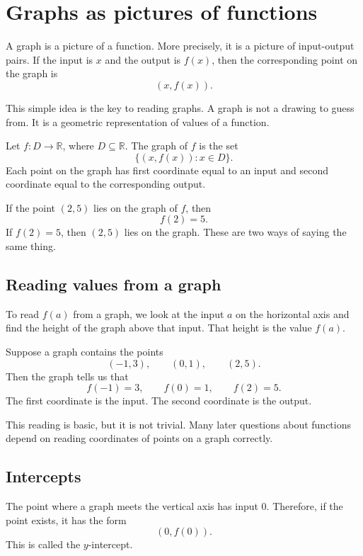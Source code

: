 \section{Graphs as pictures of functions}

A graph is a picture of a function. More precisely, it is a picture of input-output pairs. If the input is \(x\) and the output is \(f(x)\), then the corresponding point on the graph is
\[
(x,f(x)).
\]

This simple idea is the key to reading graphs. A graph is not a drawing to guess from. It is a geometric representation of values of a function.

\begin{definitionbox}
Let \(f:D\to\mathbb{R}\), where \(D\subseteq\mathbb{R}\). The graph of \(f\) is the set
\[
\{(x,f(x)):x\in D\}.
\]
Each point on the graph has first coordinate equal to an input and second coordinate equal to the corresponding output.
\end{definitionbox}

If the point \((2,5)\) lies on the graph of \(f\), then
\[
f(2)=5.
\]
If \(f(2)=5\), then \((2,5)\) lies on the graph. These are two ways of saying the same thing.

\subsection*{Reading values from a graph}

To read \(f(a)\) from a graph, we look at the input \(a\) on the horizontal axis and find the height of the graph above that input. That height is the value \(f(a)\).

\begin{examplebox}
Suppose a graph contains the points
\[
(-1,3),
\qquad
(0,1),
\qquad
(2,5).
\]
Then the graph tells us that
\[
f(-1)=3,
\qquad
f(0)=1,
\qquad
f(2)=5.
\]
The first coordinate is the input. The second coordinate is the output.
\end{examplebox}

This reading is basic, but it is not trivial. Many later questions about functions depend on reading coordinates of points on a graph correctly.

\subsection*{Intercepts}

The point where a graph meets the vertical axis has input \(0\). Therefore, if the point exists, it has the form
\[
(0,f(0)).
\]
This is called the \(y\)-intercept.

